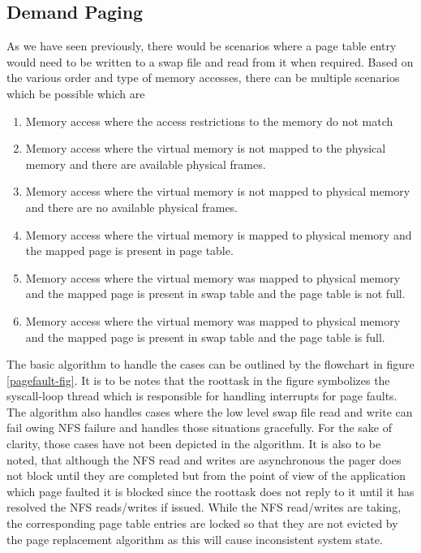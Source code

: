 \documentclass[a4paper, 11pt]{article}
\begin{document}
\subsection{Demand Paging}
As we have seen previously, there would be scenarios where a page
table entry would need to be written to a swap file and read from it
when required. Based on the various order and type of memory accesses,
there can be multiple scenarios which be possible which are
\begin{enumerate}
\item Memory access where the access restrictions to the memory do not
  match
\item Memory access where the virtual memory is not mapped to the
  physical memory and there are available physical frames.
\item Memory access where the virtual memory is not mapped to physical
  memory and there are no available physical frames.
\item Memory access where the virtual memory is mapped to physical
  memory and the mapped page is present in page table.
\item Memory access where the virtual memory was mapped to physical
  memory and the mapped page is present in swap table and the page
  table is not full.
\item Memory access where the virtual memory was mapped to physical
  memory and the mapped page is present in swap table and the page
  table is full.
\end{enumerate}
The basic algorithm to handle the cases can be outlined by the
flowchart in figure \ref{pagefault-fig}. It is to be notes that the
roottask in the figure symbolizes the syscall-loop thread which is
responsible for handling interrupts for page faults. The algorithm also
handles cases where the low level swap file read and write can fail
owing NFS failure and handles those situations gracefully. For the
sake of clarity, those cases have not been depicted in the algorithm.
It is also to be noted, that although the NFS read and writes are
asynchronous the pager does not block until they are completed but
from the point of view of the application which page faulted it is
blocked since the roottask does not reply to it until it has resolved
the NFS reads/writes if issued. While the NFS read/writes are taking,
the corresponding page table entries are locked so that they are not
evicted by the page replacement algorithm as this will cause
inconsistent system state.
\end{document}
